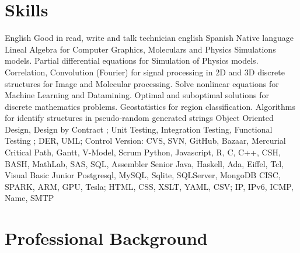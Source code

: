 \section{Skills}
        {English}
        {Good in read, write and talk technician english}
        {}
        {}
        {}
\cventry{}
        {Spanish}
        {Native language}
        {}
        {}
        {}
	{Lineal Algebra for Computer Graphics, Moleculars and Physics Simulations models. Partial differential equations for Simulation of Physics models. Correlation, Convolution (Fourier) for signal processing in 2D and 3D discrete structures for Image and Molecular processing. Solve nonlinear equations for Machine Learning and Datamining. Optimal and suboptimal solutions for discrete mathematics problems. Geostatistics for region classification. Algorithms for identify structures in pseudo-random generated strings}
	{}
	{}
	{}
	{}
        {Object Oriented Design, Design by Contract ; Unit Testing, Integration Testing, Functional Testing ; DER, UML; Control Version: CVS, SVN, GitHub, Bazaar, Mercurial}
        {}
        {}
        {}
        {}
        {Critical Path, Gantt, V-Model, Scrum}
        {}
        {}
        {}
        {}
        {Python, Javascript, R, C, C++, CSH, BASH, MathLab, SAS, SQL, Assembler}
        {Senior}
        {}
        {}
        {}
\cventry{}
        {Java, Haskell, Ada, Eiffel, Tcl, Visual Basic}
        {Junior}
        {}
        {}
        {}
        {Postgresql, MySQL, Sqlite, SQLServer, MongoDB}
        {}
        {}
        {}
        {}
        {CISC, SPARK, ARM, GPU, Tesla; HTML, CSS, XSLT, YAML, CSV; IP, IPv6, ICMP, Name, SMTP}
        {}
        {}
        {}
        {}

\section{Professional Background}\label{profesional:desde}

